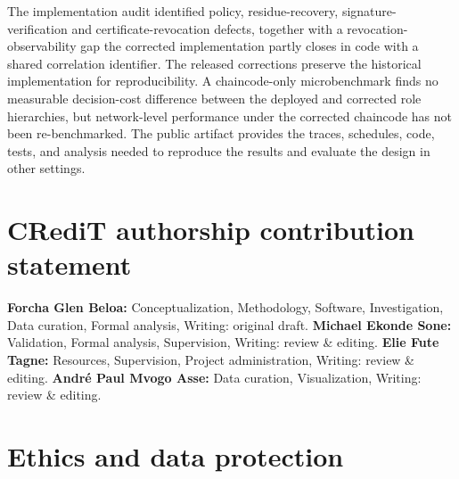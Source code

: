 \documentclass[a4paper,fleqn]{cas-sc}
\begin{document}
The implementation audit identified policy, residue-recovery,
signature-verification and certificate-revocation defects, together with a
revocation-observability gap the corrected implementation partly closes in code with a
shared correlation identifier. The released corrections preserve the
historical implementation for reproducibility. A chaincode-only
microbenchmark finds no measurable decision-cost difference between the
deployed and corrected role hierarchies, but network-level performance
under the corrected chaincode has not been re-benchmarked. The public
artifact provides the traces, schedules, code, tests, and analysis needed
to reproduce the results and evaluate the design in other settings.

\section*{CRediT authorship contribution statement}

\textbf{Forcha Glen Beloa:} Conceptualization, Methodology, Software,
Investigation, Data curation, Formal analysis, Writing: original draft.
\textbf{Michael Ekonde Sone:} Validation, Formal analysis, Supervision,
Writing: review \& editing. \textbf{Elie Fute Tagne:} Resources,
Supervision, Project administration, Writing: review \& editing.
\textbf{Andr\'{e} Paul Mvogo Asse:} Data curation, Visualization,
Writing: review \& editing.

\section*{Ethics and data protection}
\end{document}
